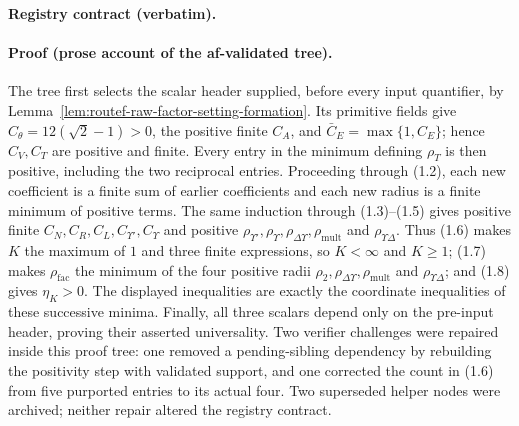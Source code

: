 \noindent\textbf{Registry contract (verbatim).}

\paragraph{Proof (prose account of the af-validated tree).}
The tree first selects the scalar header supplied, before every input quantifier, by
Lemma~\ref{lem:routef-raw-factor-setting-formation}.  Its primitive fields give
$C_\theta=12(\sqrt2-1)>0$, the positive finite $C_A$, and
$\bar C_E=\max\{1,C_E\}$; hence $C_V,C_T$ are positive and finite.  Every entry in the
minimum defining $\rho_T$ is then positive, including the two reciprocal entries.
Proceeding through (1.2), each new coefficient is a finite sum of earlier coefficients
and each new radius is a finite minimum of positive terms.  The same induction through
(1.3)--(1.5) gives positive finite $C_N,C_R,C_L,C_{\Upsilon'},C_\Upsilon$ and positive
$\rho_{\Upsilon'},\rho_\Upsilon,\rho_{\Delta\Upsilon},\rho_{\mathrm{mult}}$ and
$\rho_{\Upsilon\Delta}$.  Thus (1.6) makes $K$ the maximum of $1$ and three finite
expressions, so $K<\infty$ and $K\ge1$; (1.7) makes $\rho_{\mathrm{fac}}$ the minimum
of the four positive radii $\rho_2,\rho_{\Delta\Upsilon},\rho_{\mathrm{mult}}$ and
$\rho_{\Upsilon\Delta}$; and (1.8) gives $\eta_K>0$.  The displayed inequalities are
exactly the coordinate inequalities of these successive minima.  Finally, all three
scalars depend only on the pre-input header, proving their asserted universality.
Two verifier challenges were repaired inside this proof tree: one removed a pending-sibling
dependency by rebuilding the positivity step with validated support, and one corrected
the count in (1.6) from five purported entries to its actual four.  Two superseded helper
nodes were archived; neither repair altered the registry contract.

